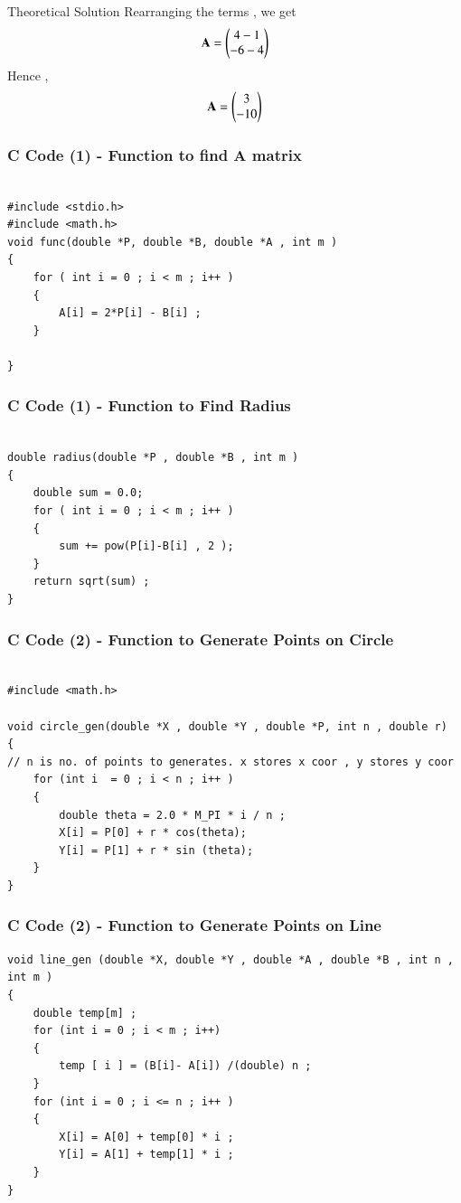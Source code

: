 \documentclass{beamer}
\begin{document}
\begin{frame}{Theoretical Solution}
Rearranging the terms , we get  
\begin{align}
    \mathbf{A} = \begin{pmatrix}4-1\\-6-4\end{pmatrix} 
\end{align}
Hence , 
\begin{align}
    \mathbf{A} = \begin{pmatrix}3\\-10\end{pmatrix}
\end{align}

\end{frame}

\begin{frame}[fragile]
    \frametitle{C Code (1) - Function to find A matrix }

    \begin{lstlisting}

#include <stdio.h>
#include <math.h>
void func(double *P, double *B, double *A , int m )
{
    for ( int i = 0 ; i < m ; i++ )
    {
        A[i] = 2*P[i] - B[i] ; 
    }

}
    \end{lstlisting}
\end{frame}
\begin{frame}[fragile]
    \frametitle{C Code (1) - Function to Find Radius}

    \begin{lstlisting}

double radius(double *P , double *B , int m )
{
    double sum = 0.0; 
    for ( int i = 0 ; i < m ; i++ )
    {
        sum += pow(P[i]-B[i] , 2 );
    }
    return sqrt(sum) ; 
}

    \end{lstlisting}
\end{frame}


\begin{frame}[fragile]
    \frametitle{C Code (2) - Function to Generate Points on Circle}

    \begin{lstlisting}

#include <math.h>

void circle_gen(double *X , double *Y , double *P, int n , double r)
{
// n is no. of points to generates. x stores x coor , y stores y coor 
    for (int i  = 0 ; i < n ; i++ )
    {
        double theta = 2.0 * M_PI * i / n ; 
        X[i] = P[0] + r * cos(theta);
        Y[i] = P[1] + r * sin (theta); 
    }   
}
    \end{lstlisting}
\end{frame}
\begin{frame}[fragile]
    \frametitle{C Code (2) - Function to Generate Points on Line}

    \begin{lstlisting}
void line_gen (double *X, double *Y , double *A , double *B , int n , int m )
{
    double temp[m] ; 
    for (int i = 0 ; i < m ; i++)
    {
        temp [ i ] = (B[i]- A[i]) /(double) n ; 
    }
    for (int i = 0 ; i <= n ; i++ )
    {
        X[i] = A[0] + temp[0] * i ; 
        Y[i] = A[1] + temp[1] * i ;
    }
}



    \end{lstlisting}
\end{frame}
\end{document}
